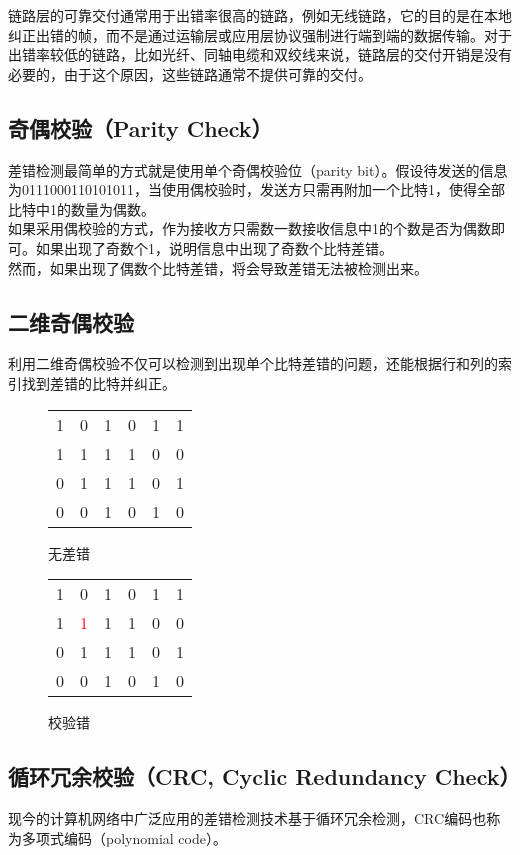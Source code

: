 链路层的可靠交付通常用于出错率很高的链路，例如无线链路，它的目的是在本地纠正出错的帧，而不是通过运输层或应用层协议强制进行端到端的数据传输。对于出错率较低的链路，比如光纤、同轴电缆和双绞线来说，链路层的交付开销是没有必要的，由于这个原因，这些链路通常不提供可靠的交付。\\

\subsection{奇偶校验（Parity Check）}

差错检测最简单的方式就是使用单个奇偶校验位（parity bit）。假设待发送的信息为0111000110101011，当使用偶校验时，发送方只需再附加一个比特1，使得全部比特中1的数量为偶数。\\

如果采用偶校验的方式，作为接收方只需数一数接收信息中1的个数是否为偶数即可。如果出现了奇数个1，说明信息中出现了奇数个比特差错。\\

然而，如果出现了偶数个比特差错，将会导致差错无法被检测出来。\\

\subsection{二维奇偶校验}

利用二维奇偶校验不仅可以检测到出现单个比特差错的问题，还能根据行和列的索引找到差错的比特并纠正。\\

\begin{figure}[H]
    \centering
    \begin{tabular}{ccccc|c}
        1 & 0 & 1 & 0 & 1 & 1 \\
        1 & 1 & 1 & 1 & 0 & 0 \\
        0 & 1 & 1 & 1 & 0 & 1 \\
        \hline
        0 & 0 & 1 & 0 & 1 & 0
    \end{tabular}
    \caption{无差错}
\end{figure}

\vspace{0.5cm}

\begin{figure}[H]
    \centering
    \begin{tabular}{ccccc|c}
        1 & 0                  & 1 & 0 & 1 & 1 \\
        1 & \textcolor{red}{1} & 1 & 1 & 0 & 0 \\
        0 & 1                  & 1 & 1 & 0 & 1 \\
        \hline
        0 & 0                  & 1 & 0 & 1 & 0
    \end{tabular}
    \caption{校验错}
\end{figure}

\vspace{0.5cm}

\subsection{循环冗余校验（CRC, Cyclic Redundancy Check）}

现今的计算机网络中广泛应用的差错检测技术基于循环冗余检测，CRC编码也称为多项式编码（polynomial code）。\\

